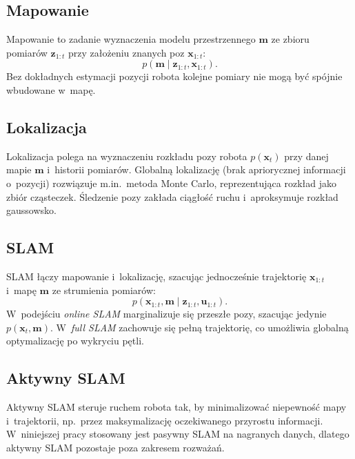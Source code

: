 \subsection{Mapowanie}

Mapowanie to zadanie wyznaczenia modelu przestrzennego $\mathbf{m}$ ze zbioru
pomiarów $\mathbf{z}_{1:t}$ przy założeniu znanych poz $\mathbf{x}_{1:t}$:
\begin{equation}
    p(\mathbf{m} \mid \mathbf{z}_{1:t}, \mathbf{x}_{1:t}).
\end{equation}
Bez dokładnych estymacji pozycji robota kolejne pomiary nie mogą być
spójnie wbudowane w~mapę.

\subsection{Lokalizacja}

Lokalizacja polega na wyznaczeniu rozkładu pozy robota $p(\mathbf{x}_t)$
przy danej mapie $\mathbf{m}$ i~historii pomiarów.
Globalną lokalizację (brak apriorycznej informacji o~pozycji) rozwiązuje
m.in.\ metoda Monte Carlo, reprezentująca rozkład jako zbiór cząsteczek.
Śledzenie pozy zakłada ciągłość ruchu i~aproksymuje rozkład gaussowsko.

\subsection{SLAM}

SLAM łączy mapowanie i~lokalizację, szacując jednocześnie trajektorię
$\mathbf{x}_{1:t}$ i~mapę $\mathbf{m}$ ze strumienia pomiarów:
\begin{equation}
    p(\mathbf{x}_{1:t}, \mathbf{m} \mid \mathbf{z}_{1:t}, \mathbf{u}_{1:t}).
\end{equation}
W~podejściu \textit{online SLAM} marginalizuje się przeszłe pozy,
szacując jedynie $p(\mathbf{x}_t, \mathbf{m})$.
W~\textit{full SLAM} zachowuje się pełną trajektorię, co umożliwia
globalną optymalizację po wykryciu pętli.

\subsection{Aktywny SLAM}

Aktywny SLAM steruje ruchem robota tak, by minimalizować niepewność mapy
i~trajektorii, np.\ przez maksymalizację oczekiwanego przyrostu informacji.
W~niniejszej pracy stosowany jest pasywny SLAM na nagranych danych,
dlatego aktywny SLAM pozostaje poza zakresem rozważań.

